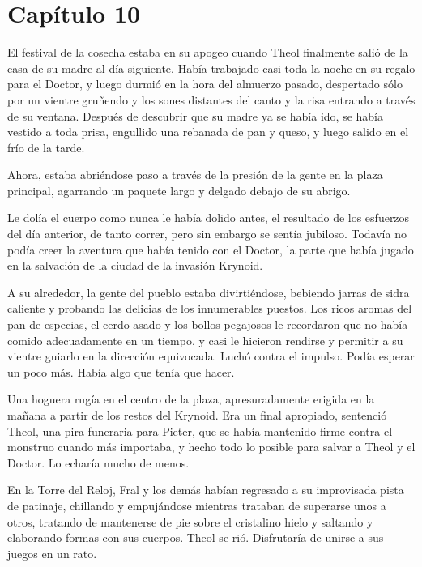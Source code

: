 \chapter*{Capítulo 10}

El festival de la cosecha estaba en su apogeo cuando Theol finalmente salió de la casa de su madre al día siguiente. Había trabajado casi toda la noche en su regalo para el Doctor, y luego durmió en la hora del almuerzo pasado, despertado sólo por un vientre gruñendo y los sones distantes del canto y la risa entrando a través de su ventana. Después de descubrir que su madre ya se había ido, se había vestido a toda prisa, engullido una rebanada de pan y queso, y luego salido en el frío de la tarde.



Ahora, estaba abriéndose paso a través de la presión de la gente en la plaza principal, agarrando un paquete largo y delgado debajo de su abrigo.



Le dolía el cuerpo como nunca le había dolido antes, el resultado de los esfuerzos del día anterior, de tanto correr, pero sin embargo se sentía jubiloso. Todavía no podía creer la aventura que había tenido con el Doctor, la parte que había jugado en la salvación de la ciudad de la invasión Krynoid.



A su alrededor, la gente del pueblo estaba divirtiéndose, bebiendo jarras de sidra caliente y probando las delicias de los innumerables puestos. Los ricos aromas del pan de especias, el cerdo asado y los bollos pegajosos le recordaron que no había comido adecuadamente en un tiempo, y casi le hicieron rendirse y permitir a su vientre guiarlo en la dirección equivocada. Luchó contra el impulso. Podía esperar un poco más. Había algo que tenía que hacer.



Una hoguera rugía en el centro de la plaza, apresuradamente erigida en la mañana a partir de los restos del Krynoid. Era un final apropiado, sentenció Theol, una pira funeraria para Pieter, que se había mantenido firme contra el monstruo cuando más importaba, y hecho todo lo posible para salvar a Theol y el Doctor. Lo echaría mucho de menos.



En la Torre del Reloj, Fral y los demás habían regresado a su improvisada pista de patinaje, chillando y empujándose mientras trataban de superarse unos a otros, tratando de mantenerse de pie sobre el cristalino hielo y saltando y elaborando formas con sus cuerpos. Theol se rió. Disfrutaría de unirse a sus juegos en un rato.



